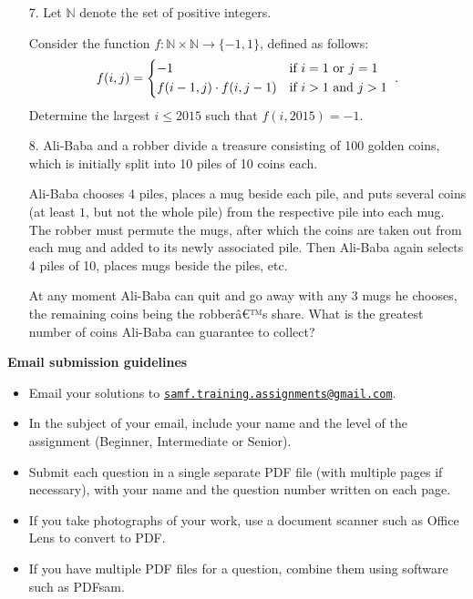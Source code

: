 \documentclass{article}
\begin{document}
\begin{enumerate}
\medskip
\item[7.] %
Let $\mathbb{N}$ denote the set of positive integers.

Consider the function $f : \mathbb{N} \times \mathbb{N} \to \{-1,1\}$, defined as follows:
\[ f(i,j) = \begin{dcases*} -1 & if $i = 1$ or $j = 1$ \\ f(i-1,j) \cdot f(i,j-1) & if $i > 1$ and $j > 1$ \end{dcases*}. \]
Determine the largest $i \leq 2015$ such that $f(i,2015) = -1$.


\medskip
\item[8.] %
Ali-Baba and a robber divide a treasure consisting of 100 golden coins, which is initially split into 10 piles of 10 coins each.

Ali-Baba chooses 4 piles, places a mug beside each pile, and puts several coins (at least $1$, but not the whole pile) from the respective pile into each mug.
The robber must permute the mugs, after which the coins are taken out from each mug and added to its newly associated pile.
Then Ali-Baba again selects 4 piles of 10, places mugs beside the piles, etc.

At any moment Ali-Baba can quit and go away with any 3 mugs he chooses, the remaining coins being the robberâ€™s share.
What is the greatest number of coins Ali-Baba can guarantee to collect?

\end{enumerate}


\vfill
\textbf{\Large Email submission guidelines}
\begin{itemize}
	\item Email your solutions to \href{mailto:samf.training.assignments@gmail.com}{\texttt{samf.training.assignments@gmail.com}}.
	\item In the subject of your email, include your name and the level of the assignment (Beginner, Intermediate or Senior).
	\item Submit each question in a single separate PDF file (with multiple pages if necessary), with your name and the question number written on each page.
	\item If you take photographs of your work, use a document scanner such as Office Lens to convert to PDF.
	\item If you have multiple PDF files for a question, combine them using software such as PDFsam.
\end{itemize}
\end{document}
